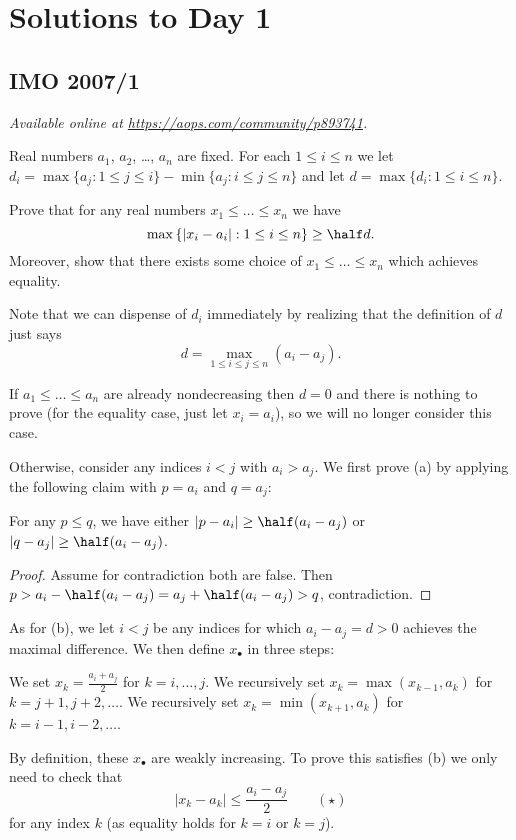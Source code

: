 \documentclass[11pt]{scrartcl}
\begin{document}
\section{Solutions to Day 1}
\subsection{IMO 2007/1}
\textsl{Available online at \url{https://aops.com/community/p893741}.}
\begin{mdframed}[style=mdpurplebox,frametitle={Problem statement}]
Real numbers $a_1$, $a_2$, \dots, $a_n$ are fixed.
For each $1 \le i \le n$ we let
$d_i = \max\{a_j : 1 \le j \le i\} - \min\{a_j : i \le j \le n\}$
and let $d = \max \{d_i : 1 \le i \le n\}$.

\begin{enumerate}[(a)]
  \ii Prove that for any real numbers $x_1 \le \dots \le x_n$ we have
  \[
    \max \left\{ \left\lvert x_i - a_i \right\rvert :
      1 \le i \le n \right\}
      \ge \half d.
  \]
  \ii Moreover, show that there exists some
  choice of $x_1 \le \dots \le x_n$ which achieves equality.
\end{enumerate}
\end{mdframed}
Note that we can dispense of $d_i$ immediately
by realizing that the definition of $d$ just says
\[ d = \max_{1 \le i \le j \le n} \left( a_i - a_j \right). \]

If $a_1 \le \dots \le a_n$ are already nondecreasing
then $d = 0$ and there is nothing to prove
(for the equality case, just let $x_i = a_i$),
so we will no longer consider this case.

Otherwise, consider any indices $i < j$ with $a_i > a_j$.
We first prove (a) by applying the following claim
with $p = a_i$ and $q = a_j$:
\begin{claim*}
  For any $p \le q$, we have
  either $|p - a_i| \ge \half(a_i-a_j)$
  or $|q - a_j| \ge \half(a_i-a_j)$.
\end{claim*}
\begin{proof}
  Assume for contradiction both are false.
  Then $p > a_i - \half(a_i-a_j)
  = a_j + \half(a_i-a_j) > q$, contradiction.
\end{proof}

As for (b), we let $i < j$ be any indices for which
$a_i - a_j = d > 0$ achieves the maximal difference.
We then define $x_\bullet$ in three steps:
\begin{itemize}
  \ii We set $x_k = \frac{a_i + a_j}{2}$ for $k = i, \dots, j$.
  \ii We recursively set $x_{k} = \max(x_{k-1}, a_k)$
  for $k = j+1, j+2, \dots$.
  \ii We recursively set $x_{k} = \min(x_{k+1}, a_k)$
  for $k = i-1, i-2, \dots$.
\end{itemize}
By definition, these $x_\bullet$ are weakly increasing.
To prove this satisfies (b) we only need to check that
\[ \left\lvert x_k - a_k \right\rvert \le \frac{a_i-a_j}{2} \qquad
  (\star) \]
for any index $k$ (as equality holds for $k = i$ or $k = j$).
\end{document}
